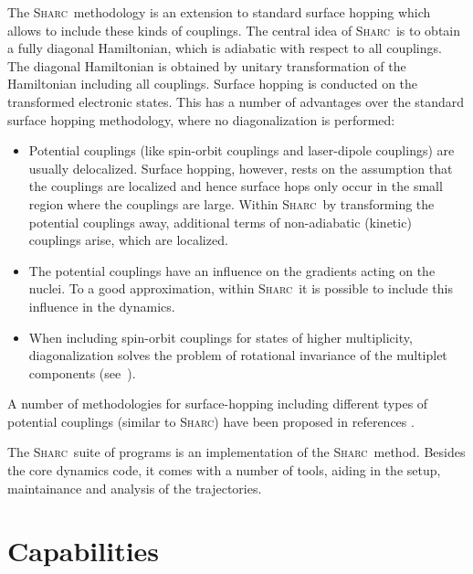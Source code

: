 \documentclass[a4paper,11pt,DIV=15,openany,twoside=false]{scrbook}
\newcommand{\sharc}{\textsc{Sharc}}
\begin{document}
The \sharc\ methodology is an extension to standard surface hopping which allows to include these kinds of couplings. The central idea of \sharc\ is to obtain a fully diagonal Hamiltonian, which is adiabatic with respect to all couplings. The diagonal Hamiltonian is obtained by unitary transformation of the Hamiltonian including all couplings. Surface hopping is conducted on the transformed electronic states. 
This has a number of advantages over the standard surface hopping methodology, where no diagonalization is performed:
\begin{itemize}
  \item Potential couplings (like spin-orbit couplings and laser-dipole couplings) are usually delocalized. Surface hopping, however, rests on the assumption that the couplings are localized and hence surface hops only occur in the small region where the couplings are large. Within \sharc\ by transforming the potential couplings away, additional terms of non-adiabatic (kinetic) couplings arise, which are localized. 
  \item The potential couplings have an influence on the gradients acting on the nuclei. To a good approximation, within \sharc\ it is possible to include this influence in the dynamics.
  \item When including spin-orbit couplings for states of higher multiplicity, diagonalization solves the problem of rotational invariance of the multiplet components (see~\cite{Granucci2012JCP}). 
\end{itemize}

A number of methodologies for surface-hopping including different types of potential couplings (similar to \sharc)
have been proposed in references \cite{Granucci2012JCP, Thachuk1996JCP, Maiti2004JPCA,Jones2008JPCA,Mitric2009PRA,Curchod2013C}.

The \sharc\ suite of programs is an implementation of the \sharc\ method. Besides the core dynamics code, it comes with a number of tools, aiding in the setup, maintainance and analysis of the trajectories. 

\section{Capabilities}
\end{document}
